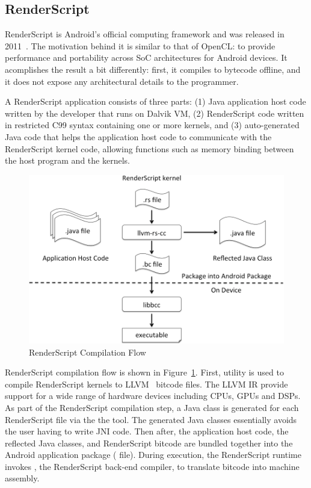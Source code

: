 
\subsection{RenderScript}
RenderScript is Android's official computing framework and was released in 
2011~\cite{RenderScript}. The motivation behind it is similar to that of OpenCL: to provide
performance and portability across SoC architectures for Android devices.
It acomplishes the result a bit differently: first, it compiles to bytecode offline, and it does not expose any architectural details to the programmer.

A RenderScript application consists of three parts: (1) Java application host
code written by the developer that runs on Dalvik VM, (2) RenderScript code
written in restricted C99 syntax containing one or more kernels, and (3)
auto-generated Java code that helps the application host code to communicate with
the RenderScript kernel code, allowing functions such as memory binding between the
host program and the kernels.

\begin{figure}
\centering
\includegraphics[scale=0.28]{figs/renderscript-compile.png}
\caption{RenderScript Compilation Flow}
\label{fig:RSCompilation}
\centering
\end{figure}

RenderScript compilation flow is shown in Figure~\ref{fig:RSCompilation}.
First,  utility is used to compile RenderScript kernels to
LLVM~\cite{LLVM:CGO04} bitcode files. The LLVM IR provide support for a wide range of hardware
devices including CPUs, GPUs and DSPs. 
As part of the RenderScript compilation step, a Java class
is generated for each RenderScript file via the the  tool.
The generated Java classes essentially avoids the user having to write JNI code.
Then after, the application host code, the reflected Java classes, and RenderScript bitcode
are bundled together into the Android application package ( file).
During execution, the RenderScript
runtime invokes , the RenderScript back-end compiler, to translate
bitcode into machine assembly.


